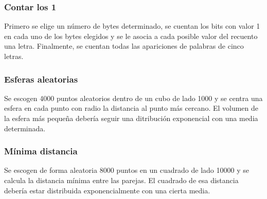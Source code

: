 \subsubsection{Contar los 1}

Primero se elige un número de bytes determinado, se cuentan los bits con valor 1 en cada uno de los bytes elegidos y se le asocia a cada posible valor del recuento una letra. Finalmente, se cuentan todas las apariciones de palabras de cinco letras.

\subsubsection{Esferas aleatorias}

Se escogen 4000 puntos aleatorios dentro de un cubo de lado 1000 y se centra una esfera en cada punto con radio la distancia al punto más cercano. El volumen de la esfera más pequeña debería seguir una ditribución exponencial con una media determinada.

\subsubsection{Mínima distancia}

Se escogen de forma aleatoria 8000 puntos en un cuadrado de lado 10000 y se calcula la distancia mínima entre las parejas. El cuadrado de esa distancia debería estar distribuida exponencialmente con una cierta media.
